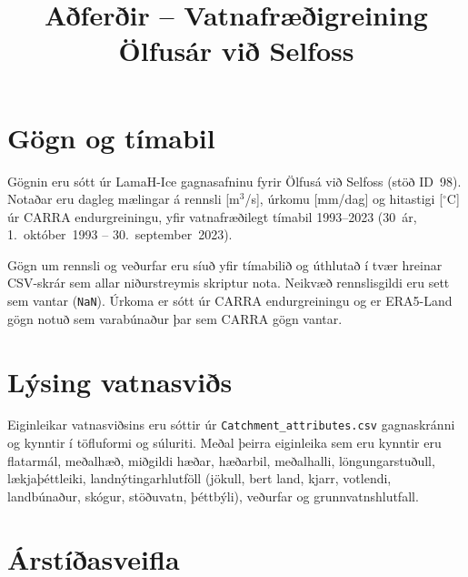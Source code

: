 \documentclass[12pt, a4paper]{article}
\title{Aðferðir -- Vatnafræðigreining Ölfusár við Selfoss}
\author{}
\date{}
\begin{document}
\maketitle
\tableofcontents
\newpage

\section{Gögn og tímabil}

Gögnin eru sótt úr LamaH-Ice gagnasafninu fyrir Ölfusá við Selfoss (stöð ID~98).
Notaðar eru dagleg mælingar á rennsli [m$^3$/s], úrkomu [mm/dag] og hitastigi [$^\circ$C]
úr CARRA endurgreiningu, yfir vatnafræðilegt tímabil 1993--2023 (30~ár,
1.~október~1993 -- 30.~september~2023).

Gögn um rennsli og veðurfar eru síuð yfir tímabilið og úthlutað í tvær hreinar
CSV-skrár sem allar niðurstreymis skriptur nota. Neikvæð rennslisgildi eru sett
sem vantar (\texttt{NaN}). Úrkoma er sótt úr CARRA endurgreiningu og er ERA5-Land
gögn notuð sem varabúnaður þar sem CARRA gögn vantar.

\section{Lýsing vatnasviðs}

Eiginleikar vatnasviðsins eru sóttir úr \texttt{Catchment\_attributes.csv}
gagnaskránni og kynntir í töfluformi og súluriti. Meðal þeirra eiginleika sem
eru kynntir eru flatarmál, meðalhæð, miðgildi hæðar, hæðarbil, meðalhalli,
löngungarstuðull, lækjaþéttleiki, landnýtingarhlutföll (jökull, bert land,
kjarr, votlendi, landbúnaður, skógur, stöðuvatn, þéttbýli), veðurfar og
grunnvatnshlutfall.

\section{Árstíðasveifla}
\end{document}
